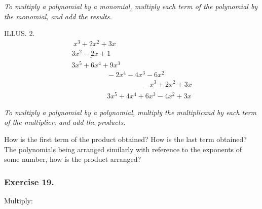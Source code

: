 \documentclass{book}
\begin{document}
\textit{To multiply a polynomial by a monomial, multiply
each term of the polynomial by the monomial,
and add the results.}

ILLUS. 2. \[\begin{matrix}
                  \;x^3 + 2x^2 + 3x \\
      \underline{3x^2 - 2x + 1} \\
                 3x^5 + 6x^4 + 9x^3 \\
     \qquad\qquad\quad -2x^4 - 4x^3 -6x^2 \\
 \qquad\qquad \underline{\qquad \qquad\qquad\quad x^3 + 2x^2 +3x} \\
            \qquad\qquad\quad 3x^5 + 4x^4 +6x^3 - 4x^2 + 3x
                 \end{matrix}\]

\textit{To multiply a polynomial by a polynomial, multiply
the multiplicand by each term of the multiplier,
and add the products.}

How is the first term of the product obtained? How is
the last term obtained? The polynomials being arranged
similarly with reference to the exponents of some number,
how is the product arranged?

\subsubsection*{Exercise 19.}

Multiply:
\end{document}

